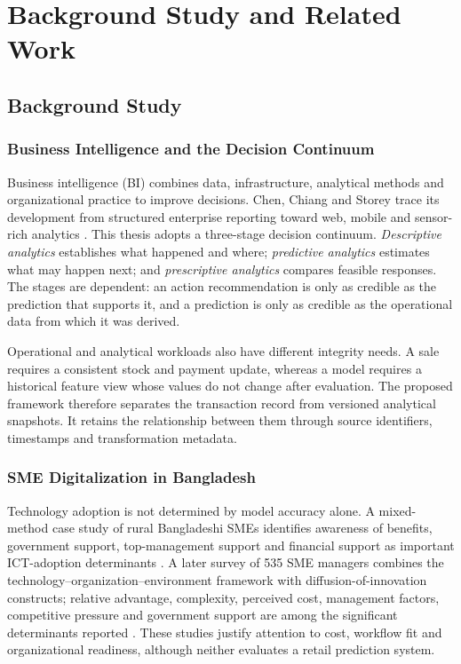 \chapter{Background Study and Related Work}
\label{chapter_backStudy}

\section{Background Study}

\subsection{Business Intelligence and the Decision Continuum}

Business intelligence (BI) combines data, infrastructure, analytical methods
and organizational practice to improve decisions. Chen, Chiang and Storey trace
its development from structured enterprise reporting toward web, mobile and
sensor-rich analytics \cite{chen2012business}. This thesis adopts a three-stage
decision continuum. \emph{Descriptive analytics} establishes what happened and
where; \emph{predictive analytics} estimates what may happen next; and
\emph{prescriptive analytics} compares feasible responses. The stages are
dependent: an action recommendation is only as credible as the prediction that
supports it, and a prediction is only as credible as the operational data from
which it was derived.

Operational and analytical workloads also have different integrity needs. A
sale requires a consistent stock and payment update, whereas a model requires a
historical feature view whose values do not change after evaluation. The
proposed framework therefore separates the transaction record from versioned
analytical snapshots. It retains the relationship between them through source
identifiers, timestamps and transformation metadata.

\subsection{SME Digitalization in Bangladesh}

Technology adoption is not determined by model accuracy alone. A mixed-method
case study of rural Bangladeshi SMEs identifies awareness of benefits,
government support, top-management support and financial support as important
ICT-adoption determinants \cite{hoque2016ict}. A later survey of 535 SME
managers combines the technology--organization--environment framework with
diffusion-of-innovation constructs; relative advantage, complexity, perceived
cost, management factors, competitive pressure and government support are among
the significant determinants reported \cite{shahadat2023digital}. These studies
justify attention to cost, workflow fit and organizational readiness, although
neither evaluates a retail prediction system.

